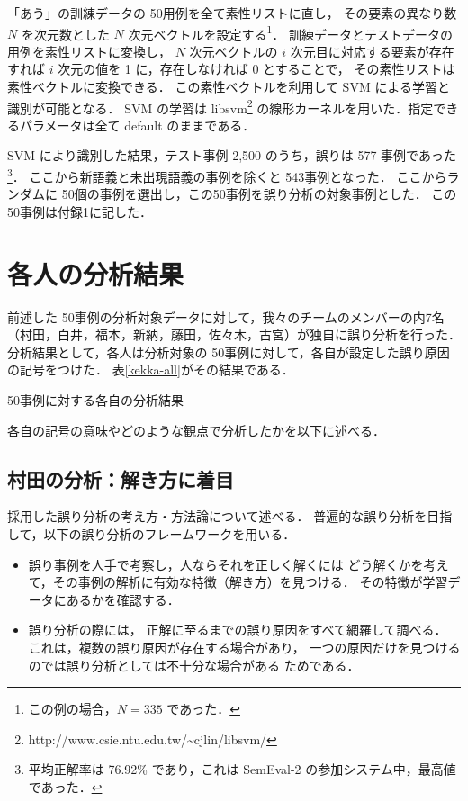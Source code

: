 \documentclass[japanese]{jnlp_1.4}
\begin{document}
「あう」の訓練データの 50用例を全て素性リストに直し，
その要素の異なり数 $N$ を次元数とした $N$ 次元ベクトルを設定する\footnote{この例の場合，$N = 335$ であった．}．
訓練データとテストデータの用例を素性リストに変換し，
$N$ 次元ベクトルの $i$ 次元目に対応する要素が存在すれば $i$ 次元の値を 1 に，存在しなければ 0 とすることで，
その素性リストは素性ベクトルに変換できる．
この素性ベクトルを利用して SVM による学習と識別が可能となる．
SVM の学習は libsvm\footnote{http://www.csie.ntu.edu.tw/{\textasciitilde}cjlin/libsvm/} の線形カーネルを用いた．指定できるパラメータは全て default のままである．

SVM により識別した結果，テスト事例 2,500 のうち，誤りは 577 事例であった
\footnote{平均正解率は 76.92\% であり，これは SemEval-2 の参加システム中，最高値であった．}．
ここから新語義と未出現語義の事例を除くと 543事例となった．
ここからランダムに 50個の事例を選出し，この50事例を誤り分析の対象事例とした．
この 50事例は付録1に記した．


\section{各人の分析結果}

前述した 50事例の分析対象データに対して，我々のチームのメンバーの内7名
（村田，白井，福本，新納，藤田，佐々木，古宮）が独自に誤り分析を行った．
分析結果として，各人は分析対象の 50事例に対して，各自が設定した誤り原因の記号をつけた．
表\ref{kekka-all}がその結果である．

\begin{table}[p]
\caption{50事例に対する各自の分析結果}
\label{kekka-all}

\end{table}

各自の記号の意味やどのような観点で分析したかを以下に述べる．


\subsection{村田の分析：解き方に着目}
\label{sec:tokikata}

採用した誤り分析の考え方・方法論について述べる．
普遍的な誤り分析を目指して，以下の誤り分析のフレームワークを用いる．

\begin{itemize}
\item 
誤り事例を人手で考察し，人ならそれを正しく解くには
どう解くかを考えて，その事例の解析に有効な特徴（解き方）を見つける．
その特徴が学習データにあるかを確認する．
\item
誤り分析の際には，
正解に至るまでの誤り原因をすべて網羅して調べる．
これは，複数の誤り原因が存在する場合があり，
一つの原因だけを見つけるのでは誤り分析としては不十分な場合がある
ためである．
\end{itemize}
\end{document}
